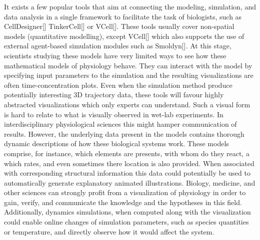 It exists a few popular tools that aim at connecting the modeling, simulation, and data analysis in a single framework to facilitate the task of biologists, such as CellDesigner[] TinkerCell[] or VCell[].
These tools usually cover non-spatial models (quantitative modelling), except VCell[] which also supports the use of external agent-based simulation modules such as Smoldyn[].
At this stage, scientists studying these models have very limited ways to see how these mathematical models of physiology behave.
They can interact with the model by specifying input parameters to the simulation and the resulting visualizations are often time-concentration plots.
Even when the simulation method produce potentially interesting 3D trajectory data, these tools will favour highly abstracted visualizations which only experts can understand.
Such a visual form is hard to relate to what is visually observed in wet-lab experiments. 
In interdisciplinary physiological sciences this might hamper communication of results. 
However, the underlying data present in the models contains thorough dynamic descriptions of how these biological systems work.
These models comprise, for instance, which elements are presents, with whom do they react, a which rates, and even sometimes there location is also provided.
When associated with corresponding structural information this data could potentially be used to automatically generate explanatory animated illustrations.
Biology, medicine, and other sciences can strongly profit from a visualization of physiology in order to gain, verify, and communicate the knowledge and the hypotheses in this field.
Additionally, dynamics simulations, when computed along with the visualization could enable online changes of simulation parameters, such as species quantities or temperature, and directly observe how it would affect the system.

